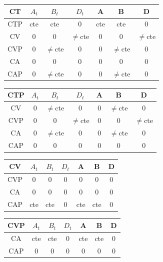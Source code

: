 \documentclass[twocolumn]{article}
\begin{document}
\begin{table}[H]
	\begin{tabular}{|c|c|c|c|c|c|c|}
		\hline
		CT & $A_t$ & $B_t$ & $D_t$ & A & B & D \\
		\hline
		CTP & cte & cte & 0 & cte & cte & 0\\
		\hline
		CV & 0 & 0 & $\neq$cte & 0 & 0 & $\neq$cte\\
		\hline
		CVP & 0 & $\neq$cte & 0 & 0 & $\neq$cte & 0\\
		\hline
		CA & 0 & 0 & 0 & 0 & 0 & 0\\
		\hline
		CAP & 0 & $\neq$cte & 0 & 0 & $\neq$cte & 0\\
		\hline
	\end{tabular}
\end{table}

\begin{table}[H]
	\begin{tabular}{|c|c|c|c|c|c|c|}
		\hline
		CTP & $A_t$ & $B_t$ & $D_t$ & A & B & D \\
		\hline
		CV & 0 & $\neq$cte & 0 & 0 & $\neq$cte & 0 \\
		\hline
		CVP & 0 & 0 & $\neq$cte & 0 & 0 & $\neq$cte\\
		\hline
		CA & 0 & $\neq$cte & 0 & 0 & $\neq$cte & 0 \\
		\hline
		CAP & 0 & 0 & 0 & 0 & 0 & 0\\
		\hline
	\end{tabular}
\end{table}

\begin{table}[H]
	\begin{tabular}{|c|c|c|c|c|c|c|}
		\hline
		CV & $A_t$ & $B_t$ & $D_t$ & A & B & D \\
		\hline
		CVP & 0 & 0 & 0 & 0 & 0 & 0\\
		\hline
		CA & 0 & 0 & 0 & 0 & 0 & 0\\
		\hline
		CAP & cte & cte & 0 & cte & cte & 0\\
		\hline
	\end{tabular}
\end{table}


\begin{table}[H]
	\begin{tabular}{|c|c|c|c|c|c|c|}
		\hline
		CVP & $A_t$ & $B_t$ & $D_t$ & A & B & D \\
		\hline
		CA & cte & cte & 0 & cte & cte & 0\\
		\hline
		CAP & 0 & 0 & 0 & 0 & 0 & 0\\
		\hline
	\end{tabular}
\end{table}
\end{document}

